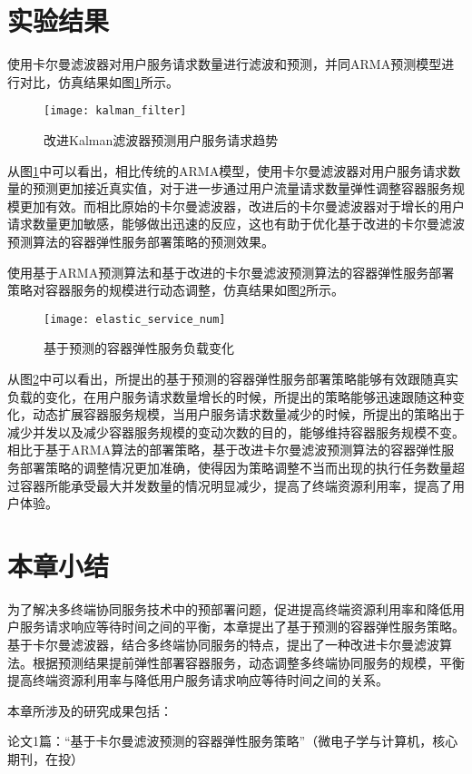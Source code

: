

\section{实验结果}\label{sec:elastic_service_experiment_results}

使用卡尔曼滤波器对用户服务请求数量进行滤波和预测，并同ARMA预测模型进行对比，仿真结果如图\ref{fig:elastic_service_kalman_filter}所示。

\begin{figure}[!htbp]
    \centering
    \texttt{[image: kalman\_filter]}\hfill
  \caption{改进Kalman滤波器预测用户服务请求趋势}
  \label{fig:elastic_service_kalman_filter}
\end{figure}

从图\ref{fig:elastic_service_kalman_filter}中可以看出，相比传统的ARMA模型，使用卡尔曼滤波器对用户服务请求数量的预测更加接近真实值，对于进一步通过用户流量请求数量弹性调整容器服务规模更加有效。而相比原始的卡尔曼滤波器，改进后的卡尔曼滤波器对于增长的用户请求数量更加敏感，能够做出迅速的反应，这也有助于优化基于改进的卡尔曼滤波预测算法的容器弹性服务部署策略的预测效果。

使用基于ARMA预测算法和基于改进的卡尔曼滤波预测算法的容器弹性服务部署策略对容器服务的规模进行动态调整，仿真结果如图\ref{fig:elastic_service_num}所示。

\begin{figure}[!htbp]
    \centering
    \texttt{[image: elastic\_service\_num]}\hfill
  \caption{基于预测的容器弹性服务负载变化}
  \label{fig:elastic_service_num}
\end{figure}

从图\ref{fig:elastic_service_num}中可以看出，所提出的基于预测的容器弹性服务部署策略能够有效跟随真实负载的变化，在用户服务请求数量增长的时候，所提出的策略能够迅速跟随这种变化，动态扩展容器服务规模，当用户服务请求数量减少的时候，所提出的策略出于减少并发以及减少容器服务规模的变动次数的目的，能够维持容器服务规模不变。相比于基于ARMA算法的部署策略，基于改进卡尔曼滤波预测算法的容器弹性服务部署策略的调整情况更加准确，使得因为策略调整不当而出现的执行任务数量超过容器所能承受最大并发数量的情况明显减少，提高了终端资源利用率，提高了用户体验。

\section{本章小结}\label{sec:elastic_service_summary}

为了解决多终端协同服务技术中的预部署问题，促进提高终端资源利用率和降低用户服务请求响应等待时间之间的平衡，本章提出了基于预测的容器弹性服务策略。基于卡尔曼滤波器，结合多终端协同服务的特点，提出了一种改进卡尔曼滤波算法。根据预测结果提前弹性部署容器服务，动态调整多终端协同服务的规模，平衡提高终端资源利用率与降低用户服务请求响应等待时间之间的关系。

本章所涉及的研究成果包括：

论文1篇：“基于卡尔曼滤波预测的容器弹性服务策略”（微电子学与计算机，核心期刊，在投）